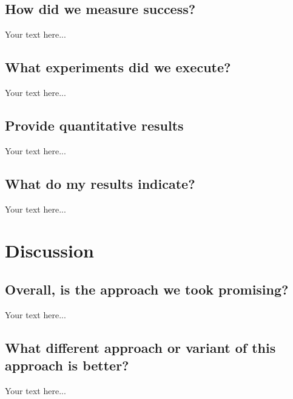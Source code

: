 \documentclass[accepted,single]{gipaper}
\begin{document}
\subsection{How did we measure success?}

Your text here...

\subsection{What experiments did we execute?}

Your text here...

\subsection{Provide quantitative results}

Your text here...

\subsection{What do my results indicate?}

Your text here...


\section{Discussion}

\subsection{Overall, is the approach we took promising?}

Your text here...

\subsection{What different approach or variant of this approach is better?}

Your text here...
\end{document}
